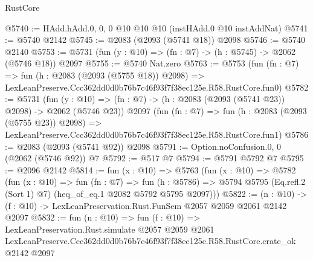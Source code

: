 \begin{lexlean}{RustCore}
\begin{coremodule}
@5740 := HAdd.hAdd.{0, 0, 0} @10 @10 @10 (instHAdd.{0} @10 instAddNat)
@5741 := @5740 @2142
@5745 := @2083 (@2093 (@5741 @18)) @2098
@5746 := @5740 @2140
@5753 := @5731 (fun (y : @10) => (fn : @7) -> (h : @5745) -> @2062 (@5746 @18)) @2097
@5755 := @5740 Nat.zero
@5763 := @5753
    (fun (fn : @7) =>
    fun (h : @2083 (@2093 (@5755 @18)) @2098) =>
    LexLeanPreserve.Ccc362dd0d0b76b7c46f93f7f38ec125e.R58.RustCore.fun0)
@5782 := @5731
    (fun (y : @10) => (fn : @7) -> (h : @2083 (@2093 (@5741 @23)) @2098) -> @2062 (@5746 @23))
    @2097
    (fun (fn : @7) =>
    fun (h : @2083 (@2093 (@5755 @23)) @2098) =>
    LexLeanPreserve.Ccc362dd0d0b76b7c46f93f7f38ec125e.R58.RustCore.fun1)
@5786 := @2083 (@2093 (@5741 @92)) @2098
@5791 := Option.noConfusion.{0, 0} (@2062 (@5746 @92)) @7
@5792 := @517 @7
@5794 := @5791 @5792 @7
@5795 := @2096 @2142
@5814 := fun (x : @10) =>
  @5763
    (fun (x : @10) =>
    @5782
      (fun (x : @10) =>
      fun (fn : @7) =>
      fun (h : @5786) =>
      @5794 @5795 (Eq.refl.{2} (Sort 1) @7) (heq_of_eq.{1} @2082 @5792 @5795 @2097)))
@5822 := (n : @10) -> (f : @10) -> LexLeanPreservation.Rust.FunSem @2057 @2059 @2061 @2142 @2097
@5832 := fun (n : @10) =>
  fun (f : @10) =>
  LexLeanPreservation.Rust.simulate
    @2057
    @2059
    @2061
    LexLeanPreserve.Ccc362dd0d0b76b7c46f93f7f38ec125e.R58.RustCore.crate_ok
    @2142
    @2097
\end{coremodule}
\end{lexlean}
